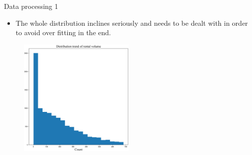 \documentclass[
  size=14pt,
  paper=smartboard,  %
  mode=present, 		%
  display=slides, 	%
  style=tuliplab,  	%
  pauseslide,
  fleqn,leqno]{powerdot}
\begin{document}
    \begin{slide}{Data processing 1}
      \begin{itemize}
      \item
      The whole distribution inclines seriously and needs to be dealt with in order to avoid over fitting in the end.
      \end{itemize}
        \begin{figure}[htb]
          \centering
          \includegraphics[width=0.5\textwidth]{figures//counts.eps}
          
    
        \end{figure}
       
      \end{slide}



    
\end{document}
